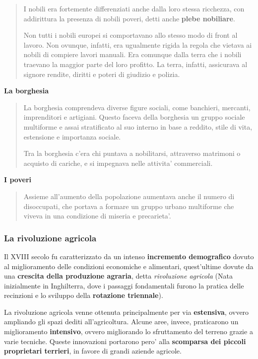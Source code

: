 \documentclass{article}
\begin{document}
{{\begin{quote}
      I nobili era fortemente differenziati anche dalla loro stessa ricchezza, con addirittura la presenza di nobili poveri, detti anche \textbf{plebe nobiliare}.

      Non tutti i nobili europei si comportavano allo stesso modo di front al lavoro. Non ovunque, infatti, era ugualmente rigida la regola che vietava ai nobili di compiere lavori manuali. Era comunque dalla terra che i nobili traevano la maggior parte del loro profitto. La terra, infatti, assicurava al signore rendite, diritti e poteri di giudizio e polizia.
    \end{quote}

    \textbf{La borghesia}
    \begin{quote}
      La borghesia comprendeva diverse figure sociali, come banchieri, mercanti, imprenditori e artigiani. Questo faceva della borghesia un gruppo sociale multiforme e assai stratificato al suo interno in base a reddito, stile di vita, estensione e importanza sociale.

      Tra la borghesia c'era chi puntava a nobilitarsi, attraverso matrimoni o acquisto di cariche, e si impegnava nelle attivita' commerciali.
    \end{quote}

    \textbf{I poveri}
    \begin{quote}
      Assieme all'aumento della popolazione aumentava anche il numero di disoccupati, che portava a formare un gruppo urbano multiforme che viveva in una condizione di miseria e precarieta'.
    \end{quote}

    \subsubsection{La rivoluzione agricola}
    Il XVIII secolo fu caratterizzato da un intenso \textbf{incremento demografico} dovuto al miglioramento delle condizioni economiche e alimentari, quest'ultime dovute da una \textbf{crescita della produzione agraria}, detta \textit{rivoluzione agricola} \small{(Nata inizialmente in Inghilterra, dove i passaggi fondamentali furono la pratica delle recinzioni e lo sviluppo della \textbf{rotazione triennale})}.

    La rivoluzione agricola venne ottenuta principalmente per via \textbf{estensiva}, ovvero ampliando gli spazi dediti all'agricoltura. Alcune aree, invece, praticarono un miglioramento \textbf{intensivo}, ovvero migliorando lo sfruttamento del terreno grazie a varie tecniche. Queste innovazioni portarono pero' alla \textbf{scomparsa dei piccoli proprietari terrieri}, in favore di grandi aziende agricole.

}}
\end{document}
